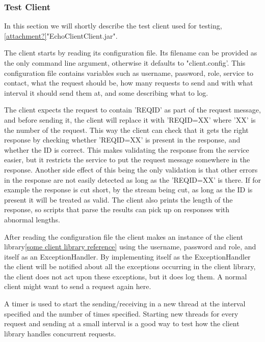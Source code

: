 \subsubsection{Test Client}\label{Testing:About:Client}
    In this section we will shortly describe the test client used for testing, \ref{attachment?}"EchoClientClient.jar".

    The client starts by reading its configuration file. Its filename can be provided as the only command line argument, otherwise it defaults to "client.config'. This configuration file contains variables such as username, password, role, service to contact, what the request should be, how many requests to send and with what interval it should send them at, and some describing what to log.

    The client expects the request to contain '{REQID}' as part of the request message, and before sending it, the client will replace it with '{REQID=XX}' where 'XX' is the number of the request. This way the client can check that it gets the right response by checking whether '{REQID=XX}' is present in the response, and whether the ID is correct. This makes validating the response from the service easier, but it restricts the service to put the request message somewhere in the response. Another side effect of this being the only validation is that other errors in the response are not easily detected as long as the '{REQID=XX}' is there. If for example the response is cut short, by the stream being cut, as long as the ID is present it will be treated as valid. The client also prints the length of the response, so scripts that parse the results can pick up on responses with abnormal lengths.

    After reading the configuration file the client makes an instance of the client library\ref{some client library reference} 
    using the username, password and role, and itself as an ExceptionHandler. By implementing itself as the ExceptionHandler the client will be notified about all the exceptions occurring in the client library, the client does not act upon these exceptions, but it does log them. A normal client might want to send a request again here.
    
    A timer is used to start the sending/receiving in a new thread at the interval specified and the number of times specified. Starting new threads for every request and sending at a small interval is a good way to test how the client library handles concurrent requests.

